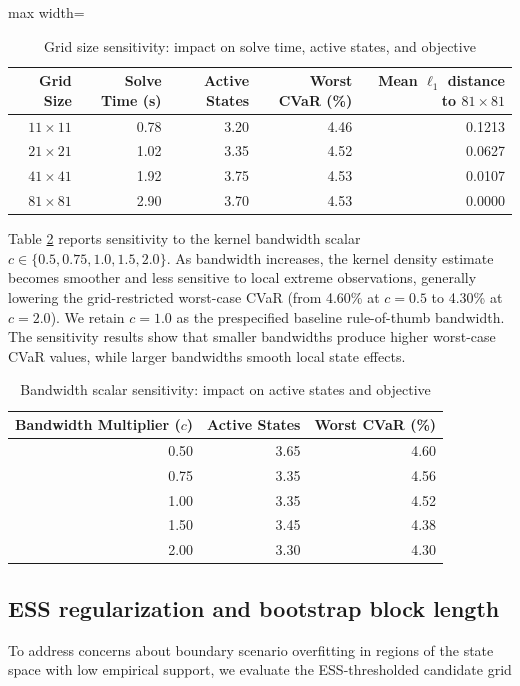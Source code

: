 \documentclass[smallextended]{svjour3}
\begin{document}
\begin{table}[htbp]
\centering
\caption{Grid size sensitivity: impact on solve time, active states, and objective}
\label{tab:sens_grid}
\begin{adjustbox}{max width=\textwidth}
\begin{tabular}{rrrrr}
\toprule
\textbf{Grid Size} & \textbf{Solve Time (s)} & \textbf{Active States} & \textbf{Worst CVaR (\%)} & \textbf{Mean $\ell_1$ distance to $81\times81$} \\
\midrule
$11\times11$ & 0.78 & 3.20 & 4.46 & 0.1213 \\
$21\times21$ & 1.02 & 3.35 & 4.52 & 0.0627 \\
$41\times41$ & 1.92 & 3.75 & 4.53 & 0.0107 \\
$81\times81$ & 2.90 & 3.70 & 4.53 & 0.0000 \\
\bottomrule
\end{tabular}
\end{adjustbox}
\end{table}

Table \ref{tab:sens_bw} reports sensitivity to the kernel bandwidth scalar $c \in \{0.5, 0.75, 1.0, 1.5, 2.0\}$. As bandwidth increases, the kernel density estimate becomes smoother and less sensitive to local extreme observations, generally lowering the grid-restricted worst-case CVaR (from 4.60\% at $c=0.5$ to 4.30\% at $c=2.0$). We retain $c=1.0$ as the prespecified baseline rule-of-thumb bandwidth. The sensitivity results show that smaller bandwidths produce higher worst-case CVaR values, while larger bandwidths smooth local state effects.

\begin{table}[htbp]
\centering
\caption{Bandwidth scalar sensitivity: impact on active states and objective}
\label{tab:sens_bw}
\begin{tabular}{rrr}
\toprule
\textbf{Bandwidth Multiplier ($c$)} & \textbf{Active States} & \textbf{Worst CVaR (\%)} \\
\midrule
0.50 & 3.65 & 4.60 \\
0.75 & 3.35 & 4.56 \\
1.00 & 3.35 & 4.52 \\
1.50 & 3.45 & 4.38 \\
2.00 & 3.30 & 4.30 \\
\bottomrule
\end{tabular}
\end{table}

\subsection{ESS regularization and bootstrap block length}
To address concerns about boundary scenario overfitting in regions of the state space with low empirical support, we evaluate the ESS-thresholded candidate grid
\end{document}
